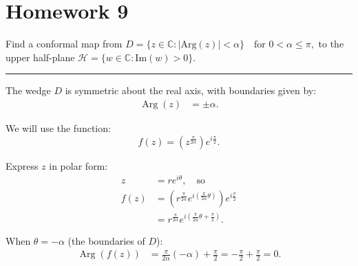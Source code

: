 \chapter{Homework 9}

\begin{example}
    Find a conformal map from
    $D = \{ z \in \mathbb{C} : |\text{Arg}(z)| < \alpha \} \quad \text{for } 0 < \alpha \leq \pi,$
    to the upper half-plane
    $\mathcal{H} = \{ w \in \mathbb{C} : \text{Im}(w) > 0 \}$.

    \hrule
    \vspace{0.5cm}

    The wedge $D$ is symmetric about the real axis, with boundaries given by:
    \begin{align*}
        \operatorname{Arg}(z) & = \pm \alpha.
    \end{align*}

    We will use the function:
    \[
        f(z) = \left( z^{\frac{\pi}{2\alpha}} \right) e^{i\frac{\pi}{2}}.
    \]

    Express $z$ in polar form:
    \begin{align*}
        z    & = r e^{i\theta}, \quad \text{so}                                                                            \\
        f(z) & = \left( r^{\frac{\pi}{2\alpha}} e^{i \left( \frac{\pi}{2\alpha} \theta \right)} \right) e^{i\frac{\pi}{2}} \\
             & = r^{\frac{\pi}{2\alpha}} e^{i \left( \frac{\pi}{2\alpha} \theta + \frac{\pi}{2} \right)}.
    \end{align*}

    When $\theta = -\alpha$ (the boundaries of $D$):
    \begin{align*}
        \operatorname{Arg}(f(z)) & = \frac{\pi}{2\alpha} (-\alpha) + \frac{\pi}{2} = -\frac{\pi}{2} + \frac{\pi}{2} = 0.
    \end{align*}


\end{example}
